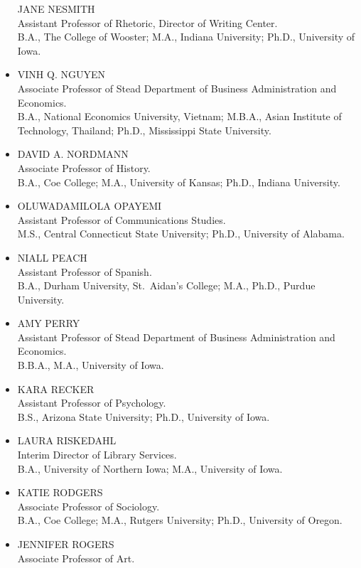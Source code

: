 \documentclass[
  letterpaper,
]{scrbook}
\begin{document}
\begin{itemize}
  JANE NESMITH\\
  Assistant Professor of Rhetoric, Director of Writing Center.\\
  B.A., The College of Wooster; M.A., Indiana University; Ph.D.,
  University of Iowa.
\item
  VINH Q. NGUYEN\\
  Associate Professor of Stead Department of Business Administration and
  Economics.\\
  B.A., National Economics University, Vietnam; M.B.A., Asian Institute
  of Technology, Thailand; Ph.D., Mississippi State University.
\item
  DAVID A. NORDMANN\\
  Associate Professor of History.\\
  B.A., Coe College; M.A., University of Kansas; Ph.D., Indiana
  University.
\item
  OLUWADAMILOLA OPAYEMI\\
  Assistant Professor of Communications Studies.\\
  M.S., Central Connecticut State University; Ph.D., University of
  Alabama.
\item
  NIALL PEACH\\
  Assistant Professor of Spanish.\\
  B.A., Durham University, St.~Aidan's College; M.A., Ph.D., Purdue
  University.
\item
  AMY PERRY\\
  Assistant Professor of Stead Department of Business Administration and
  Economics.\\
  B.B.A., M.A., University of Iowa.
\item
  KARA RECKER\\
  Assistant Professor of Psychology.\\
  B.S., Arizona State University; Ph.D., University of Iowa.
\item
  LAURA RISKEDAHL\\
  Interim Director of Library Services.\\
  B.A., University of Northern Iowa; M.A., University of Iowa.
\item
  KATIE RODGERS\\
  Associate Professor of Sociology.\\
  B.A., Coe College; M.A., Rutgers University; Ph.D., University of
  Oregon.
\item
  JENNIFER ROGERS\\
  Associate Professor of Art.\\

\end{itemize}
\end{document}
